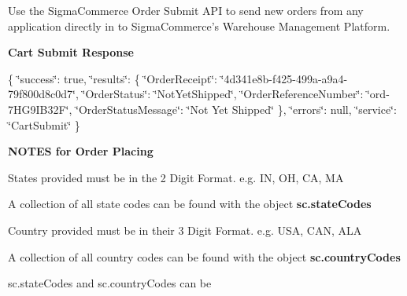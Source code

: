 Use the Sigma\-Commerce Order Submit A\-P\-I to send new orders from any application directly in to Sigma\-Commerce's Warehouse Management Platform. 


{\bfseries Cart Submit Response}

\{ \char`\"{}success\char`\"{}\-: true, \char`\"{}results\char`\"{}\-: \{ \char`\"{}\-Order\-Receipt\char`\"{}\-: \char`\"{}4d341e8b-\/f425-\/499a-\/a9a4-\/79f800d8c0d7\char`\"{}, \char`\"{}\-Order\-Status\char`\"{}\-: \char`\"{}\-Not\-Yet\-Shipped\char`\"{}, \char`\"{}\-Order\-Reference\-Number\char`\"{}\-: \char`\"{}ord-\/7\-H\-G9\-I\-B32\-F\char`\"{}, \char`\"{}\-Order\-Status\-Message\char`\"{}\-: \char`\"{}\-Not Yet Shipped\char`\"{} \}, \char`\"{}errors\char`\"{}\-: null, \char`\"{}service\char`\"{}\-: \char`\"{}\-Cart\-Submit\char`\"{} \}

{\bfseries N\-O\-T\-E\-S for Order Placing}


\begin{DoxyItemize}
\item States provided must be in the 2 Digit Format. e.\-g. I\-N, O\-H, C\-A, M\-A
\begin{DoxyItemize}
\item A collection of all state codes can be found with the object {\bfseries sc.\-state\-Codes}
\end{DoxyItemize}
\item Country provided must be in their 3 Digit Format. e.\-g. U\-S\-A, C\-A\-N, A\-L\-A
\item A collection of all country codes can be found with the object {\bfseries sc.\-country\-Codes}
\item sc.\-state\-Codes and sc.\-country\-Codes can be
\end{DoxyItemize}

